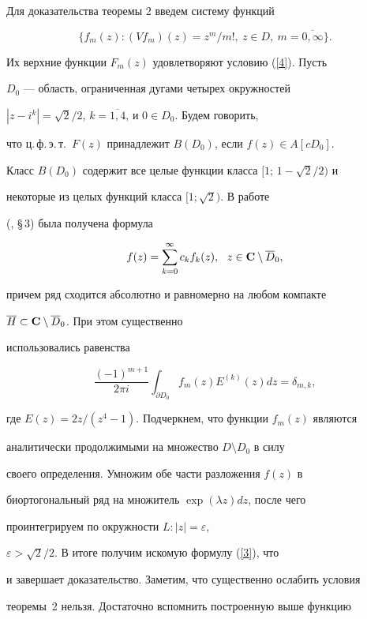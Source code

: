 Для доказательства теоремы 2 введем систему функций 


$$


\{f_m(z) : (Vf_m)(z)=z^m/m!,\ z\in D,\ m=\overline{0,\infty} \}.


$$


Их верхние функции $F_m(z)$ удовлетворяют условию (\ref{4}). Пусть


$D_0$ --- область, ограниченная дугами четырех окружностей


$|z-i^k|=\sqrt2/2$, $k=\overline{1,4}$, и $0\in D_0$. Будем говорить,


что ц.\,ф.\,э.\,т.\ $F(z)$ принадлежит $B(D_0)$, если $f(z)\in A[cD_0]$.


Класс $B(D_0)$ содержит все целые функции класса $[1;\,1- \sqrt2/2)$ и


некоторые из целых функций класса $[1;\sqrt2)$. В работе


(\cite{Avtor2}, \S\,3) была получена формула


$$


f(z)=\sum_{k=0}^\infty c_k f_k(z),\ \ z\in \C\setminus\overline D_0,


$$


причем ряд сходится абсолютно и равномерно на любом компакте


$\overline H\subset\bold C\setminus\overline D_0$. При этом существенно


использовались равенства


$$


\frac{(-1)^{m+1}}{2\pi i}\int_{\partial D_0}


f_m(z)E^{(k)}(z)dz = \delta_{m,k},


$$


где $E(z)=2z/(z^4-1)$. Подчеркнем, что функции $f_m(z)$ являются


аналитически продолжимыми на множество $D\setminus D_0$ в силу


своего определения. Умножим обе части разложения $f(z)$ в


биортогональный ряд на множитель $\exp(\lambda z)dz$, после чего


проинтегрируем по окружности $L: |z|=\varepsilon$,


$\varepsilon >\sqrt2/2$. В итоге получим искомую формулу (\ref{3}), что


и завершает доказательство. Заметим, что существенно ослабить условия


теоремы~2 нельзя. Достаточно вспомнить построенную выше функцию


